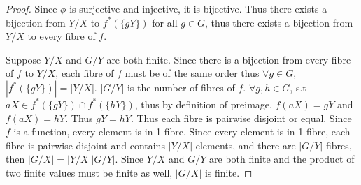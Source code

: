 \documentclass{article}
\newcommand{\abs}[1]{\lvert #1\rvert}
\begin{document}
\begin{proof}
    Since $\phi$ is surjective and injective, it is bijective. Thus there exists a bijection from $Y/X$ to $f^*(\{gY\})$ for all $g \in G$, thus there exists a bijection from $Y/X$ to every fibre of $f$.


    Suppose $Y/X$ and $G/Y$ are both finite. Since there is a bijection from every fibre of $f$ to $Y/X$, each fibre of $f$ must be of the same order thus $\forall g \in G$, $|f^*(\{gY\})| = |Y/X|$. $|G/Y|$ is the number of fibres of $f$. $\forall g, h \in G$, s.t $aX \in f^*(\{gY\}) \cap f^*(\{hY\})$, thus by definition of preimage, $f(aX) = gY$ and $f(aX) = hY$. Thus $gY = hY$. Thus each fibre is pairwise disjoint or equal. Since $f$ is a function, every element is in 1 fibre. Since every element is in 1 fibre, each fibre is pairwise disjoint and contains $|Y/X|$ elements, and there are $\abs{G/Y}$ fibres, then $\abs{G/X} = \abs{Y/X}\abs{G/Y}$. Since $Y/X$ and $G/Y$ are both finite and the product of two finite values must be finite as well, $\abs{G/X}$ is finite.
\end{proof}

\bigskip
\end{document}
